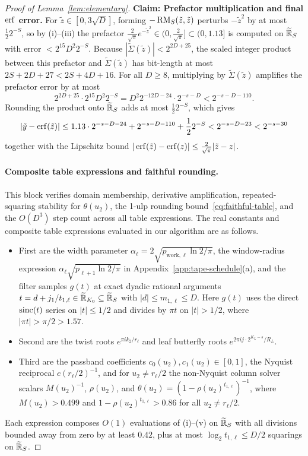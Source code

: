 \begin{proof}[Proof of Lemma~\ref{lem:elementary}]
\textbf{Claim: Prefactor multiplication and final $\operatorname{erf}$ error.}
For $\tilde{z} \in [0, 3\sqrt{D}]$, forming $-\operatorname{RM}_S(\tilde{z}, \tilde{z})$ perturbs $-\tilde{z}^2$ by at most $\frac{1}{2} 2^{-S}$, so by (i)--(iii) the prefactor $\frac{2}{\sqrt{\pi}} e^{-\tilde{z}^2} \in (0, \frac{2}{\sqrt{\pi}}] \subset (0, 1.13]$ is computed on $\widetilde{\mathbb{R}}_S$ with error $< 2^{15} D^2 2^{-S}$. Because $|\widetilde{\Sigma}(\tilde{z})| < 2^{2D+25}$, the scaled integer product between this prefactor and $\widetilde{\Sigma}(\tilde{z})$ has bit-length at most $2S + 2D + 27 < 2S + 4D + 16$. For all $D \ge 8$, multiplying by $\widetilde{\Sigma}(\tilde{z})$ amplifies the prefactor error by at most
\[
  2^{2D+25} \cdot 2^{15} D^2 2^{-S} = D^2 2^{-12D-24} \cdot 2^{-s-D} < 2^{-s-D-110}.
\]
Rounding the product onto $\widetilde{\mathbb{R}}_S$ adds at most $\frac{1}{2} 2^{-S}$, which gives
\[
  |\tilde{y} - \operatorname{erf}(\tilde{z})| \le 1.13 \cdot 2^{-s-D-24} + 2^{-s-D-110} + \frac{1}{2} 2^{-S} < 2^{-s-D-23} < 2^{-s-30}
\]
together with the Lipschitz bound $|\operatorname{erf}(\tilde{z}) - \operatorname{erf}(z)| \le \frac{2}{\sqrt{\pi}}|\tilde{z} - z|$.

\paragraph{Composite table expressions and faithful rounding.}
This block verifies domain membership, derivative amplification, repeated-squaring stability for $\theta(u_2)$, the 1-ulp rounding bound~\eqref{eq:faithful-table}, and the $O(D^3)$ step count across all table expressions.
The real constants and composite table expressions evaluated in our algorithm are as follows.
\begin{itemize}[leftmargin=*,nosep]
  \item First are the width parameter $\alpha_\ell = 2\sqrt{p_{\mathrm{work},\ell}\ln 2 / \pi}$, the window-radius expression $\alpha_\ell\sqrt{p_{\ell+1}\ln 2/\pi}$ in Appendix~\ref{app:tape-schedule}(a), and the filter samples $g(t)$ at exact dyadic rational arguments $t = d + j_1/t_{1,\ell} \in \widetilde{\mathbb{R}}_{K_0} \subseteq \widetilde{\mathbb{R}}_S$ with $|d| \le m_{1,\ell} \le D$. Here $g(t)$ uses the direct $\operatorname{sinc}(t)$ series on $|t| \le 1/2$ and divides by $\pi t$ on $|t| > 1/2$, where $|\pi t| > \pi/2 > 1.57$.
  \item Second are the twist roots $e^{\pi i k_2 / r_\ell}$ and leaf butterfly roots $e^{2\pi i j \cdot 2^{K_L - s} / R_L}$.
  \item Third are the passband coefficients $c_0(u_2), c_1(u_2) \in [0, 1]$, the Nyquist reciprocal $c(r_\ell/2)^{-1}$, and for $u_2 \ne r_\ell/2$ the non-Nyquist column solver scalars $M(u_2)^{-1}$, $\rho(u_2)$, and $\theta(u_2) = (1 - \rho(u_2)^{t_{1,\ell}})^{-1}$, where $M(u_2) > 0.499$ and $1 - \rho(u_2)^{t_{1,\ell}} > 0.86$ for all $u_2 \ne r_\ell/2$.
\end{itemize}
Each expression composes $O(1)$ evaluations of (i)--(v) on $\widetilde{\mathbb{R}}_S$ with all divisions bounded away from zero by at least $0.42$, plus at most $\log_2 t_{1,\ell} \le D/2$ squarings on $\widetilde{\mathbb{R}}_S$.


\end{proof}
